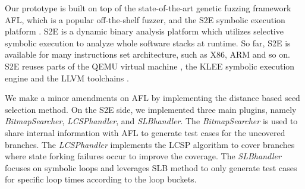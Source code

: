 Our prototype is built on top of the state-of-the-art genetic fuzzing framework AFL, which is a popular off-the-shelf fuzzer, and the S2E symbolic execution platform \cite{chipounov2011s2e}. S2E is a dynamic binary analysis platform which utilizes selective symbolic execution to analyze whole software stacks at runtime. So far, S2E is available for many instructions set architecture, such as X86, ARM and so on. S2E reuses parts of the QEMU virtual machine \cite{bellard2005qemu}, the KLEE symbolic execution engine \cite{cadar2008klee} and the LLVM toolchains \cite{lattner2004llvm}.

We make a minor amendments on AFL by implementing the distance based seed selection method. On the S2E side, we implemented three main plugins, namely \textit{BitmapSearcher}, \textit{LCSPhandler}, and \textit{SLBhandler}. The \textit{BitmapSearcher} is used to share internal information with AFL to generate test cases for the uncovered branches. The \textit{LCSPhandler} implements the LCSP algorithm to cover branches where state forking failures occur to improve the coverage. The \textit{SLBhandler} focuses on symbolic loops and leverages SLB method to only generate test cases for specific loop times according to the loop buckets. 
